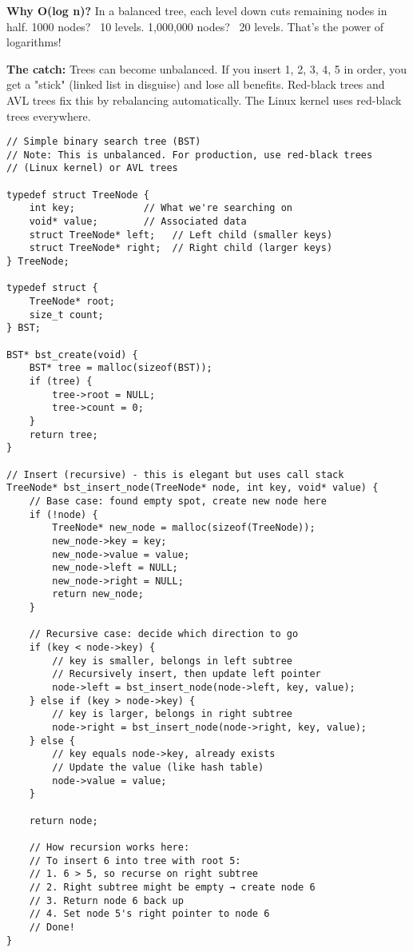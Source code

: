\textbf{Why O(log n)?} In a balanced tree, each level down cuts remaining nodes in half. 1000 nodes? ~10 levels. 1,000,000 nodes? ~20 levels. That's the power of logarithms!

\textbf{The catch:} Trees can become unbalanced. If you insert 1, 2, 3, 4, 5 in order, you get a "stick" (linked list in disguise) and lose all benefits. Red-black trees and AVL trees fix this by rebalancing automatically. The Linux kernel uses red-black trees everywhere.

\begin{lstlisting}
// Simple binary search tree (BST)
// Note: This is unbalanced. For production, use red-black trees
// (Linux kernel) or AVL trees

typedef struct TreeNode {
    int key;            // What we're searching on
    void* value;        // Associated data
    struct TreeNode* left;   // Left child (smaller keys)
    struct TreeNode* right;  // Right child (larger keys)
} TreeNode;

typedef struct {
    TreeNode* root;
    size_t count;
} BST;

BST* bst_create(void) {
    BST* tree = malloc(sizeof(BST));
    if (tree) {
        tree->root = NULL;
        tree->count = 0;
    }
    return tree;
}

// Insert (recursive) - this is elegant but uses call stack
TreeNode* bst_insert_node(TreeNode* node, int key, void* value) {
    // Base case: found empty spot, create new node here
    if (!node) {
        TreeNode* new_node = malloc(sizeof(TreeNode));
        new_node->key = key;
        new_node->value = value;
        new_node->left = NULL;
        new_node->right = NULL;
        return new_node;
    }

    // Recursive case: decide which direction to go
    if (key < node->key) {
        // key is smaller, belongs in left subtree
        // Recursively insert, then update left pointer
        node->left = bst_insert_node(node->left, key, value);
    } else if (key > node->key) {
        // key is larger, belongs in right subtree
        node->right = bst_insert_node(node->right, key, value);
    } else {
        // key equals node->key, already exists
        // Update the value (like hash table)
        node->value = value;
    }

    return node;

    // How recursion works here:
    // To insert 6 into tree with root 5:
    // 1. 6 > 5, so recurse on right subtree
    // 2. Right subtree might be empty → create node 6
    // 3. Return node 6 back up
    // 4. Set node 5's right pointer to node 6
    // Done!
}


\end{lstlisting}
